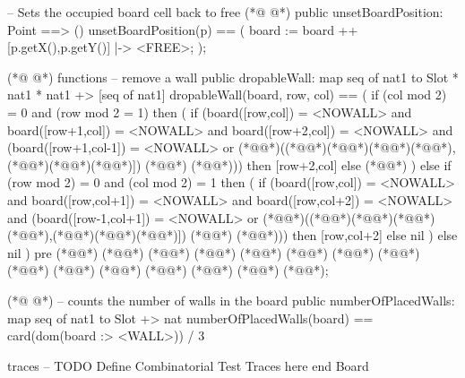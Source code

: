 \begin{vdmpp}[breaklines=true]
  -- Sets the occupied board cell back to free
(*@
\label{unsetBoardPosition:280}
@*)
  public unsetBoardPosition: Point ==> ()
  unsetBoardPosition(p) ==
  (
   board := board ++ {[p.getX(),p.getY()]  |-> <FREE>}; 
  );
  
  
(*@
\label{dropableWall:287}
@*)
functions
  -- remove a wall
  public dropableWall: map seq of nat1 to Slot * nat1 * nat1 +> [seq of nat1]
  dropableWall(board, row, col) == 
  (
   if (col mod 2) = 0 and (row mod 2 = 1)
   then (
    if (board([row,col]) = <NOWALL> and board([row+1,col]) = <NOWALL> and board([row+2,col]) = <NOWALL> and (board([row+1,col-1]) = <NOWALL> or (*@@*)((*@\vdmnotcovered{[}@*)(*@@*)(*@\vdmnotcovered{+}@*)(*@@*),(*@@*)(*@\vdmnotcovered{+}@*)(*@@*)]) (*@\vdmnotcovered{=}@*) (*@@*))) 
    then [row+2,col]
    else (*@@*)
   )
   else 
   if (row mod 2) = 0 and (col mod 2) = 1
   then (
    if (board([row,col]) = <NOWALL> and board([row,col+1]) = <NOWALL> and board([row,col+2]) = <NOWALL> and (board([row-1,col+1]) = <NOWALL> or (*@@*)((*@\vdmnotcovered{[}@*)(*@@*)(*@\vdmnotcovered{+}@*)(*@@*),(*@@*)(*@\vdmnotcovered{+}@*)(*@@*)]) (*@\vdmnotcovered{=}@*) (*@@*)))
    then [row,col+2]
    else nil
   )
   else nil
  )
  pre (*@@*) (*@\vdmnotcovered{>}@*) (*@@*) (*@@*) (*@@*) (*@\vdmnotcovered{<}@*) (*@@*) (*@@*) (*@@*) (*@\vdmnotcovered{>}@*) (*@@*) (*@@*) (*@@*) (*@\vdmnotcovered{<}@*) (*@@*);
  
(*@
\label{numberOfPlacedWalls:309}
@*)
  -- counts the number of walls in the board
  public numberOfPlacedWalls: map seq of nat1 to Slot +> nat
  numberOfPlacedWalls(board) ==
  card(dom(board :> {<WALL>})) / 3
 
traces
-- TODO Define Combinatorial Test Traces here  
end Board
\end{vdmpp}
\bigskip
